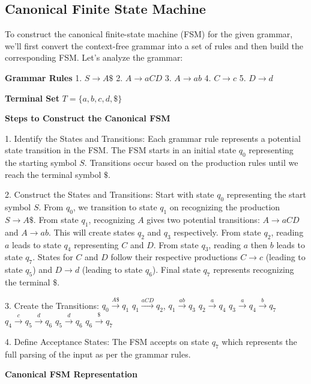 
\subsection{Canonical Finite State Machine}
To construct the canonical finite-state machine (FSM) for the given grammar, we'll first convert the context-free grammar into a set of rules and then build the corresponding FSM. Let's analyze the grammar:


\textbf{Grammar Rules}
1. \( S \rightarrow A\$ \)
2. \( A \rightarrow aCD \)
3. \( A \rightarrow ab \)
4. \( C \rightarrow c \)
5. \( D \rightarrow d \)

\textbf{Terminal Set}
\( T = \{a, b, c, d, \$\} \)

\textbf{Steps to Construct the Canonical FSM}

1. Identify the States and Transitions:
   Each grammar rule represents a potential state transition in the FSM.
   The FSM starts in an initial state \(q_0\) representing the starting symbol \(S\).
   Transitions occur based on the production rules until we reach the terminal symbol \( \$ \).

2. Construct the States and Transitions:
   Start with state \(q_0\) representing the start symbol \( S \). From \(q_0\), we transition to state \(q_1\) on recognizing the production \( S \rightarrow A\$ \).
   From state \(q_1\), recognizing \(A\) gives two potential transitions: \( A \rightarrow aCD \) and \( A \rightarrow ab \). This will create states \(q_2\) and \(q_3\) respectively.
   From state \(q_2\), reading \(a\) leads to state \(q_4\) representing \( C \) and \( D \).
   From state \(q_3\), reading \(a\) then \(b\) leads to state \(q_7\).
   States for \(C\) and \(D\) follow their respective productions \(C \rightarrow c\) (leading to state \(q_5\)) and \(D \rightarrow d\) (leading to state \(q_6\)).
   Final state \(q_7\) represents recognizing the terminal \( \$ \).

3. Create the Transitions:
   \(q_0 \xrightarrow{A\$} q_1\)
   \(q_1 \xrightarrow{aCD} q_2\), \(q_1 \xrightarrow{ab} q_3\)
   \(q_2 \xrightarrow{a} q_4\)
   \(q_3 \xrightarrow{a} q_4 \xrightarrow{b} q_7\)
   \(q_4 \xrightarrow{c} q_5 \xrightarrow{d} q_6\)
   \(q_5 \xrightarrow{d} q_6\)
   \(q_6 \xrightarrow{\$} q_7\)

4. Define Acceptance States:
   The FSM accepts on state \(q_7\) which represents the full parsing of the input as per the grammar rules.

\textbf{Canonical FSM Representation}

